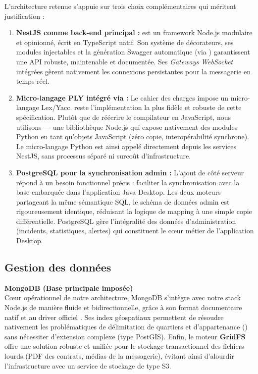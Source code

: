 \documentclass[12pt,a4paper]{article}
\begin{document}
\vspace{10pt}

\begin{infobox}
    L'architecture retenue s'appuie sur trois choix complémentaires qui méritent justification :
    \begin{enumerate}
        \item \textbf{NestJS comme back-end principal :}  est un framework Node.js modulaire et opinionné, écrit en TypeScript natif. Son système de décorateurs, ses modules injectables et la génération Swagger automatique (via ) garantissent une API robuste, maintenable et documentée. Ses \textit{Gateways WebSocket} intégrées gèrent nativement les connexions persistantes pour la messagerie en temps réel.
        \item \textbf{Micro-langage PLY intégré via  :} Le cahier des charges impose un micro-langage Lex/Yacc.  reste l'implémentation la plus fidèle et robuste de cette spécification. Plutôt que de réécrire le compilateur en JavaScript, nous utilisons  — une bibliothèque Node.js qui expose nativement des modules Python en tant qu'objets JavaScript (zéro copie, interopérabilité synchrone). Le micro-langage Python est ainsi appelé directement depuis les services NestJS, sans processus séparé ni surcoût d'infrastructure.
        \item \textbf{PostgreSQL pour la synchronisation admin :} L'ajout de  côté serveur répond à un besoin fonctionnel précis : faciliter la synchronisation avec la base  embarquée dans l'application Java Desktop. Les deux moteurs partageant la même sémantique SQL, le schéma de données admin est rigoureusement identique, réduisant la logique de mapping à une simple copie différentielle. PostgreSQL gère l'intégralité des données d'administration (incidents, statistiques, alertes) qui constituent le cœur métier de l'application Desktop.
    \end{enumerate}
\end{infobox}

\subsection{Gestion des données}

\textbf{MongoDB (Base principale imposée)} \\
Cœur opérationnel de notre architecture, MongoDB s'intègre avec notre stack Node.js
de manière fluide et bidirectionnelle, grâce à son format documentaire natif et au driver officiel . Ses index géospatiaux  permettent de résoudre nativement les problématiques de
délimitation de quartiers et d'appartenance () sans nécessiter d'extension complexe (type PostGIS).
Enfin, le moteur \textbf{GridFS} offre une solution robuste et unifiée pour le stockage transactionnel
des fichiers lourds (PDF des contrats, médias de la messagerie), évitant ainsi d'alourdir l'infrastructure
avec un service de stockage de type S3.
\end{document}
